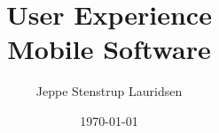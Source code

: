 \documentclass[12pt]{article}
\title{%
User Experience \\
\large Mobile Software}
\author{Jeppe Stenstrup Lauridsen}
\date{\today}
\begin{document}
\begin{titlepage}
\clearpage\maketitle
\thispagestyle{empty}
\end{titlepage}
\end{document}
